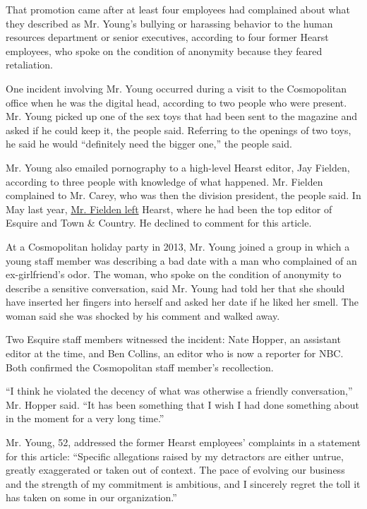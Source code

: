 That promotion came after at least four employees had complained about
what they described as Mr. Young's bullying or harassing behavior to the
human resources department or senior executives, according to four
former Hearst employees, who spoke on the condition of anonymity because
they feared retaliation.

One incident involving Mr. Young occurred during a visit to the
Cosmopolitan office when he was the digital head, according to two
people who were present. Mr. Young picked up one of the sex toys that
had been sent to the magazine and asked if he could keep it, the people
said. Referring to the openings of two toys, he said he would
``definitely need the bigger one,'' the people said.

Mr. Young also emailed pornography to a high-level Hearst editor, Jay
Fielden, according to three people with knowledge of what happened. Mr.
Fielden complained to Mr. Carey, who was then the division president,
the people said. In May last year,
\href{https://www.nytimes3xbfgragh.onion/2019/05/23/business/media/esquires-editor-fielden-hearst-magazines.html}{Mr.
Fielden left} Hearst, where he had been the top editor of Esquire and
Town \& Country. He declined to comment for this article.

At a Cosmopolitan holiday party in 2013, Mr. Young joined a group in
which a young staff member was describing a bad date with a man who
complained of an ex-girlfriend's odor. The woman, who spoke on the
condition of anonymity to describe a sensitive conversation, said Mr.
Young had told her that she should have inserted her fingers into
herself and asked her date if he liked her smell. The woman said she was
shocked by his comment and walked away.

Two Esquire staff members witnessed the incident: Nate Hopper, an
assistant editor at the time, and Ben Collins, an editor who is now a
reporter for NBC. Both confirmed the Cosmopolitan staff member's
recollection.

``I think he violated the decency of what was otherwise a friendly
conversation,'' Mr. Hopper said. ``It has been something that I wish I
had done something about in the moment for a very long time.''

Mr. Young, 52, addressed the former Hearst employees' complaints in a
statement for this article: ``Specific allegations raised by my
detractors are either untrue, greatly exaggerated or taken out of
context. The pace of evolving our business and the strength of my
commitment is ambitious, and I sincerely regret the toll it has taken on
some in our organization.''

